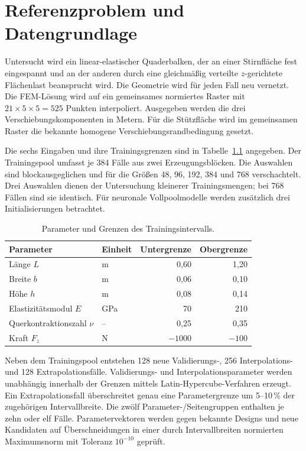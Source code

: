 \chapter{Referenzproblem und Datengrundlage}
Untersucht wird ein linear-elastischer Quaderbalken, der an einer Stirnfläche fest eingespannt und an der anderen durch eine gleichmäßig verteilte $z$-gerichtete Flächenlast beansprucht wird. Die Geometrie wird für jeden Fall neu vernetzt. Die FEM-Lösung wird auf ein gemeinsames normiertes Raster mit $21\times5\times5=525$ Punkten interpoliert. Ausgegeben werden die drei Verschiebungskomponenten in Metern. Für die Stützfläche wird im gemeinsamen Raster die bekannte homogene Verschiebungsrandbedingung gesetzt.

Die sechs Eingaben und ihre Trainingsgrenzen sind in Tabelle~\ref{tab:grenzen} angegeben. Der Trainingspool umfasst je 384 Fälle aus zwei Erzeugungsblöcken. Die Auswahlen sind blockausgeglichen und für die Größen 48, 96, 192, 384 und 768 verschachtelt. Drei Auswahlen dienen der Untersuchung kleinerer Trainingsmengen; bei 768 Fällen sind sie identisch. Für neuronale Vollpoolmodelle werden zusätzlich drei Initialisierungen betrachtet.
\begin{table}[htbp]\centering\caption{Parameter und Grenzen des Trainingsintervalls.}\label{tab:grenzen}
\begin{tabular}{llrr}\toprule Parameter & Einheit & Untergrenze & Obergrenze\\\midrule
Länge $L$ & m & 0,60 & 1,20\\ Breite $b$ & m & 0,06 & 0,10\\ Höhe $h$ & m & 0,08 & 0,14\\ Elastizitätsmodul $E$ & GPa & 70 & 210\\ Querkontraktionszahl $\nu$ & -- & 0,25 & 0,35\\ Kraft $F_z$ & N & $-1000$ & $-100$\\\bottomrule\end{tabular}\end{table}

Neben dem Trainingspool entstehen 128 neue Validierungs-, 256 Interpolations- und 128 Extrapolationsfälle. Validierungs- und Interpolationsparameter werden unabhängig innerhalb der Grenzen mittels Latin-Hypercube-Verfahren erzeugt. Ein Extrapolationsfall überschreitet genau eine Parametergrenze um 5--10\,\% der zugehörigen Intervallbreite. Die zwölf Parameter-/Seitengruppen enthalten je zehn oder elf Fälle. Parametervektoren werden gegen bekannte Designs und neue Kandidaten auf Überschneidungen in einer durch Intervallbreiten normierten Maximumsnorm mit Toleranz $10^{-10}$ geprüft.


